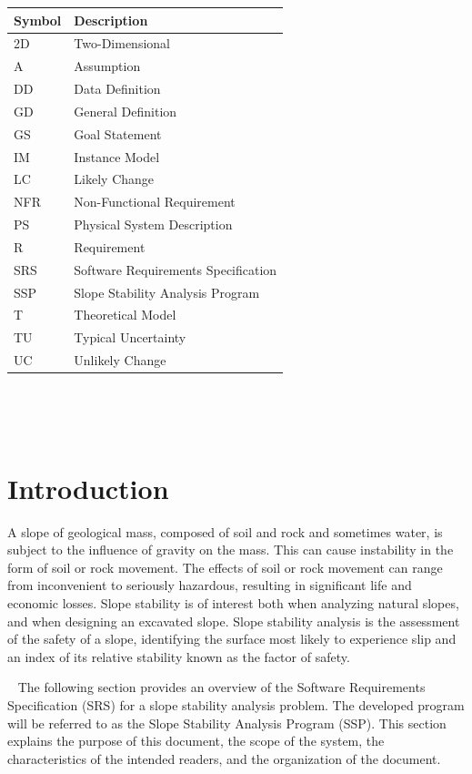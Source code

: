 \documentclass[12pt]{article}
\newcommand{\progname}{SSP}
\renewcommand{\arraystretch}{1}
\begin{document}
\renewcommand{\arraystretch}{1.2}
\begin{tabular}{l l} 
  \toprule		
  \textbf{Symbol} & \textbf{Description}\\
  \midrule 
  2D & Two-Dimensional\\
  A & Assumption\\
  DD & Data Definition\\
  GD & General Definition\\
  GS & Goal Statement\\
  IM & Instance Model\\
  LC & Likely Change\\
  NFR & Non-Functional Requirement\\
  PS & Physical System Description\\
  R & Requirement\\
  SRS & Software Requirements Specification\\
  \progname\ & Slope Stability Analysis Program\\
  T & Theoretical Model\\
  TU & Typical Uncertainty\\
  UC & Unlikely Change\\
  \bottomrule
\end{tabular}\\

\newpage

\tableofcontents

~\newpage


\setlength{\tabcolsep}{6pt}

\section{Introduction}

A slope of geological mass, composed of soil and rock and sometimes water, is 
subject to the influence of gravity on the mass. This can cause instability in 
the form of soil or rock movement. The effects of soil or rock movement can 
range from inconvenient to seriously hazardous, resulting in significant life 
and economic losses. Slope stability is of interest both when analyzing natural 
slopes, and when designing an excavated slope. Slope stability analysis is the 
assessment of the safety of a slope, identifying the surface most likely to 
experience slip and an index of its relative stability known as the factor of 
safety.

~\newline
The following section provides an overview of the Software Requirements 
Specification (SRS) for a slope stability analysis problem. The developed 
program will be referred to as the Slope Stability Analysis Program 
(\progname). This section explains the purpose of this document, the 
scope of the system, the characteristics of the intended readers, and the 
organization of the document.
\end{document}
